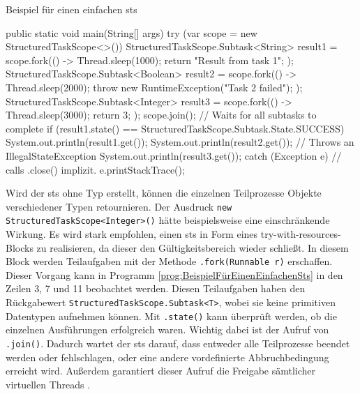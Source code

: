     \begin{program} [H]
        \caption{Beispiel für einen einfachen \gls{sts}}
        \label{prog:BeispielFürEinenEinfachenSts}
    \begin{JavaCode}[language=Java, numbers=left]
public static void main(String[] args) {
    try (var scope = new StructuredTaskScope<>()) {
        StructuredTaskScope.Subtask<String> result1 = scope.fork(() -> {
            Thread.sleep(1000);
            return "Result from task 1";
        });
        StructuredTaskScope.Subtask<Boolean> result2 = scope.fork(() -> {
            Thread.sleep(2000);
            throw new RuntimeException("Task 2 failed");
        });
        StructuredTaskScope.Subtask<Integer> result3 = scope.fork(() -> {
            Thread.sleep(3000);
            return 3;
        });
        scope.join();                        // Waits for all subtasks to complete
        if (result1.state() == StructuredTaskScope.Subtask.State.SUCCESS){
            System.out.println(result1.get());  
        } 
        System.out.println(result2.get());   // Throws an IllegalStateException
        System.out.println(result3.get());
    } catch (Exception e) {                  // calls .close() implizit.
        e.printStackTrace();
    }
}\end{JavaCode}
    \end{program}
    Wird der \gls{sts} ohne Typ erstellt, können die einzelnen Teilprozesse Objekte verschiedener Typen retournieren. Der Ausdruck \texttt{new StructuredTaskScope<Integer>()}
    hätte beispielsweise eine einschränkende Wirkung.
    Es wird stark empfohlen, einen \gls{sts} in Form eines try-with-resources-Blocks zu realisieren, da dieser den Gültigkeitsbereich wieder schließt. In diesem Block
    werden Teilaufgaben mit der Methode \texttt{.fork(Runnable r)} erschaffen. Dieser Vorgang kann in Programm \ref{prog:BeispielFürEinenEinfachenSts} in den Zeilen 3, 7 und 11 beobachtet werden.
    Diesen Teilaufgaben haben den Rückgabewert \texttt{StructuredTaskScope.Subtask<T>}, wobei sie keine
    primitiven Datentypen aufnehmen können. Mit \texttt{.state()} kann überprüft werden, ob die einzelnen Ausführungen erfolgreich waren.
    Wichtig dabei ist der Aufruf von \texttt{.join()}. Dadurch wartet der \gls{sts} darauf, dass entweder alle Teilprozesse beendet werden oder
    fehlschlagen, oder
    eine andere vordefinierte Abbruchbedingung erreicht wird. Außerdem garantiert dieser Aufruf die Freigabe sämtlicher virtuellen Threads \cite{oracle21STS}.
    

